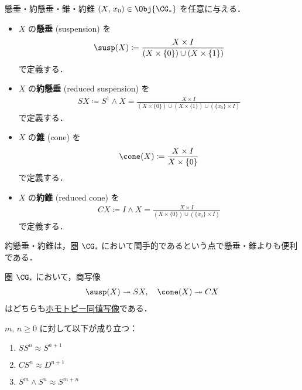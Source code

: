 \documentclass[algtopo_main]{subfiles}
\begin{document}
\begin{mydef}[label=def:suspension, breakable]{懸垂・約懸垂・錐・約錐}
    $(X,\, x_0)\in \Obj{\CG_*}$ を任意に与える．
    \begin{itemize}
        \item $X$ の\textbf{懸垂} (suspension) を
        \begin{align}
            \susp(X) \coloneqq \frac{X \times I}{(X \times \{0\}) \cup (X \times \{1\})}
        \end{align}
        で定義する．
        \item $X$ の\textbf{約懸垂} (reduced suspension) を
        \begin{align}
            SX \coloneqq S^1 \wedge X = \frac{X \times I}{(X \times \{0\}) \cup (X \times \{1\}) \cup (\{x_0\} \times I)}
        \end{align}
        で定義する．
        \item $X$ の\textbf{錐} (cone) を
        \begin{align}
            \cone(X) \coloneqq \frac{X \times I}{X \times \{0\}}
        \end{align}
        で定義する．
        \item $X$ の\textbf{約錐} (reduced cone) を
        \begin{align}
            CX \coloneqq I \wedge X = \frac{X \times I}{(X \times \{0\}) \cup (\{x_0\} \times I)}
        \end{align}
        で定義する．
    \end{itemize}
\end{mydef}

\begin{marker}
    約懸垂・約錐は，圏 $\CG_*$ において関手的であるという点で懸垂・錐よりも便利である．
\end{marker}

\begin{myprop}[]{}
    圏 $\CG_*$ において，商写像
    \begin{align}
        \susp(X) \twoheadrightarrow SX,\quad \cone(X) \twoheadrightarrow CX
    \end{align}
    はどちらも\hyperref[def:homotopy-basic]{ホモトピー同値写像}である．
\end{myprop}

\begin{myprop}[label=prop:sphere-susp]{}
    $m,\, n \ge 0$ に対して以下が成り立つ：
    \begin{enumerate}
        \item $SS^n \approx S^{n+1}$
        \item $CS^n \approx D^{n+1}$
        \item $S^m \wedge S^n \approx S^{m+n}$
    \end{enumerate}
\end{myprop}
\end{document}
